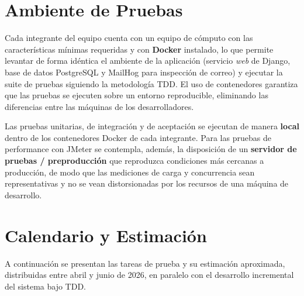 \documentclass[12pt,letterpaper]{report}
\begin{document}
\chapter{Ambiente de Pruebas}

Cada integrante del equipo cuenta con un equipo de cómputo con las
características mínimas requeridas y con \textbf{Docker} instalado, lo que
permite levantar de forma idéntica el ambiente de la aplicación (servicio
\emph{web} de Django, base de datos PostgreSQL y MailHog para inspección de
correo) y ejecutar la suite de pruebas siguiendo la metodología TDD. El uso de
contenedores garantiza que las pruebas se ejecuten sobre un entorno
reproducible, eliminando las diferencias entre las máquinas de los
desarrolladores.

Las pruebas unitarias, de integración y de aceptación se ejecutan de manera
\textbf{local} dentro de los contenedores Docker de cada integrante. Para las
pruebas de performance con JMeter se contempla, además, la disposición de un
\textbf{servidor de pruebas / preproducción} que reproduzca condiciones más
cercanas a producción, de modo que las mediciones de carga y concurrencia sean
representativas y no se vean distorsionadas por los recursos de una máquina de
desarrollo.

\chapter{Calendario y Estimación}

A continuación se presentan las tareas de prueba y su estimación aproximada,
distribuidas entre abril y junio de 2026, en paralelo con el desarrollo
incremental del sistema bajo TDD.
\end{document}

